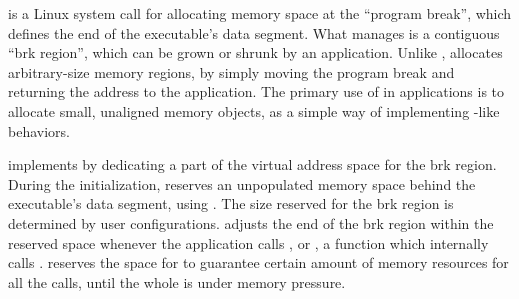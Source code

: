  is a Linux system call for 
allocating memory space at the ``program break'', which defines the end of the executable's data segment.
What  manages is a contiguous ``brk region'', which can be grown or shrunk by an application.
Unlike ,  allocates arbitrary-size memory regions, by simply moving the program break
and returning the address to the application.
The primary use of  in applications is %
to allocate small, unaligned memory objects,
as a simple way of implementing -like behaviors.





\thelibos{} implements  by dedicating a part of the virtual address space for the brk region.
During the initialization, \thelibos{} reserves an unpopulated memory space
behind the executable's data segment, using .
The size reserved for the brk region is determined
by user configurations.
\thelibos{} adjusts the end of the brk region
within the reserved space
whenever the application calls , or , a \libc{} function which internally calls .
\thelibos{} reserves the space for 
to guarantee certain amount of memory resources for all the  calls,
until the whole \picoproc{} is under memory pressure.





